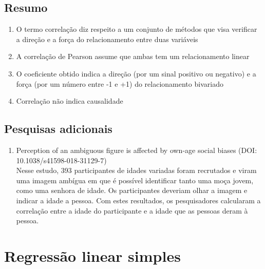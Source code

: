 \documentclass[
]{book}
\providecommand{\tightlist}{%
  \setlength{\itemsep}{0pt}\setlength{\parskip}{0pt}}
\begin{document}
\hypertarget{resumo-11}{%
\section{Resumo}\label{resumo-11}}

\begin{explore}

\begin{enumerate}
\def\labelenumi{\arabic{enumi}.}
\tightlist
\item
  O termo correlação diz respeito a um conjunto de métodos que visa
  verificar a direção e a força do relacionamento entre duas variáveis\\
\item
  A correlação de Pearson assume que ambas tem um relacionamento
  linear\\
\item
  O coeficiente obtido indica a direção (por um sinal positivo ou
  negativo) e a força (por um número entre -1 e +1) do relacionamento
  bivariado\\
\item
  Correlação não indica causalidade\\
\end{enumerate}

\end{explore}

\hypertarget{pesquisas-adicionais-5}{%
\section{Pesquisas adicionais}\label{pesquisas-adicionais-5}}

\begin{enumerate}
\def\labelenumi{\arabic{enumi}.}
\tightlist
\item
  Perception of an ambiguous figure is affected by own-age social biases
  (DOI: 10.1038/s41598-018-31129-7)\\
  Nesse estudo, 393 participantes de idades variadas foram recrutados e
  viram uma imagem ambígua em que é possível identificar tanto uma moça
  jovem, como uma senhora de idade. Os participantes deveriam olhar a
  imagem e indicar a idade a pessoa. Com estes resultados, os
  pesquisadores calcularam a correlação entre a idade do participante e
  a idade que as pessoas deram à pessoa.
\end{enumerate}

\hypertarget{regressuxe3o-linear-simples}{%
\chapter{Regressão linear simples}\label{regressuxe3o-linear-simples}}
\end{document}
